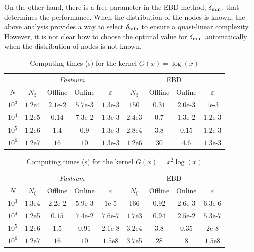 \documentclass[main]{subfiles}
\begin{document}
On the other hand, there is a free parameter in the EBD method, $\delta_{\min}$, that determines the performance. When the distribution of the nodes is known, the above analysis provides a way to select $\delta_{\min}$ to ensure a quasi-linear complexity. However, it is not clear how to choose the optimal value for $\delta_{\min}$ automatically when the distribution of nodes is not known. 

\begin{table}[H]
	\centering
	\caption{Computing times (s) for the kernel $G(x) = \log(x)$}
	\begin{tabular}{*9c}
		\toprule
		&  \multicolumn{4}{c}{\textit{Fastsum}} & \multicolumn{4}{c}{EBD}\\
		\cmidrule(lr){2-5}\cmidrule(lr){6-9}
		$N$   & $N_\xi$ & Offline   & Online    & $\varepsilon$ & $N_\xi$ & Offline   & Online  & $\varepsilon$ \\
		$10^3$   & $1.2$e4 & $2.1$e-2   & $5.7$e-3    & $1.3$e-3 & $150$ & $0.31$   & $2.0$e-3  & $1$e-3 \\
		$10^4$   & $1.2$e5 & $0.14$   & $7.3$e-2    & $1.3$e-3 & $2.4$e3 & $0.7$  & $1.3$e-2 & $1.2$e-3 \\
		$10^5$   & $1.2$e6 & $1.4$ & $0.9$    & $1.3$e-3 & $2.8$e4 & $3.8$   & $0.15$  & $1.2$e-3 \\
		$10^6$   & $1.2$e7 & $16$   &  $10$    & $1.3$e-3 & $1.2$e6 & $30$ & $4.6$  & $1.3$e-3 \\
		\bottomrule
	\end{tabular}
\end{table}
\vspace{-0.5cm}
\begin{table}[t]
	\centering
	\caption{Computing times (s) for the kernel $G(x) = x^2\log(x)$}
	\begin{tabular}{*9c}
		\toprule
		&  \multicolumn{4}{c}{\textit{Fastsum}} & \multicolumn{4}{c}{EBD}\\
		\cmidrule(lr){2-5}\cmidrule(lr){6-9}
		$N$   & $N_\xi$ & Offline   & Online    & $\varepsilon$ & $N_\xi$ & Offline   & Online  & $\varepsilon$ \\
		$10^3$   & $1.3$e4 & $2.2$e-$2$   & $5.9$e-$3$    & $1$e-5 & 166 & 0.92   & $2.6$e-$3$   & $6.3$e-6 \\
		$10^4$   & $1.2$e5 & $0.15$  & $7.4$e-2    & $7.6$e-7 & $1.7$e3 & $0.94$   & $2.5$e-2  & $5.3$e-7 \\
		$10^5$   & $1.2$e6 & $1.5$   & $0.91$    & $2.1$e-8 & $3.2$e4 & $3.8$   & $0.35$  & $2$e-8 \\
		$10^6$   & $1.2$e7 & $16$   & $10$    & $1.5$e8 & $3.7$e5 & $28$   & $8$  & $1.5$e8 \\		
		\bottomrule
	\end{tabular}
\end{table}
\end{document}
